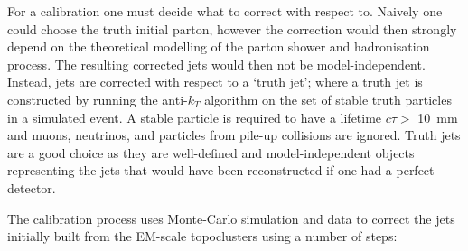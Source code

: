 For a calibration one must decide what to correct with respect to.
Naively one could choose the truth initial parton,
however the correction would then strongly depend on the theoretical modelling of the parton shower and hadronisation process.
The resulting corrected jets would then not be model-independent.
Instead, jets are corrected with respect to a `truth jet';
where a truth jet is constructed by running the anti-$k_T$ algorithm on the set of stable truth particles in a simulated event.
A stable particle is required to have a lifetime $c\tau >$ \SI{10}{\milli\metre} and muons, neutrinos, and particles from pile-up collisions are ignored.
Truth jets are a good choice as they are well-defined and model-independent objects representing the jets that would have been reconstructed if one had a perfect detector.

The calibration process uses Monte-Carlo simulation and data to correct the jets initially
built from the EM-scale topoclusters using a number of steps:

